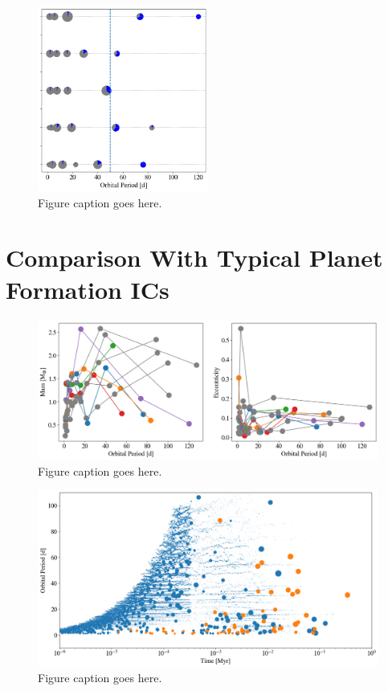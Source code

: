 \begin{figure}
\begin{center}
    \includegraphics[width=0.5\textwidth]{figures/stip/snowline.png}
    \caption{Figure caption goes here.\label{fig:snowline}}
\end{center}
\end{figure}

\section{Comparison With Typical Planet Formation ICs} \label{sec:typicalICs}

\begin{figure}
\begin{center}
    \includegraphics[width=\textwidth]{figures/stip/per_mass_ecc_iso_comp.png}
    \caption{Figure caption goes here.\label{fig:per_mass_ecc_iso_comp}}
\end{center}
\end{figure}

\begin{figure}
\begin{center}
    \includegraphics[width=\textwidth]{figures/stip/full_coll_iso_comp.png}
    \caption{Figure caption goes here.\label{fig:full_coll_iso_comp}}
\end{center}
\end{figure}

